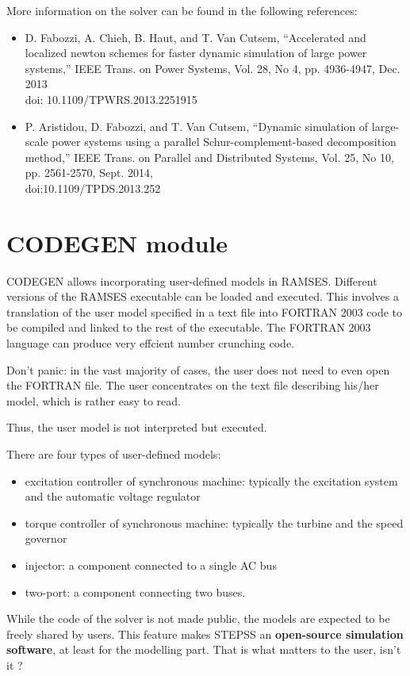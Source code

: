 More information on the solver can be found in the following references:
\begin{itemize}
\item{} D. Fabozzi, A. Chieh, B. Haut, and T. Van Cutsem, ``Accelerated and localized newton schemes for faster dynamic simulation of large power systems,'' IEEE Trans. on Power Systems, Vol. 28, No 4, pp. 4936-4947, Dec. 2013\\ doi: 10.1109/TPWRS.2013.2251915
\item{} P. Aristidou, D. Fabozzi, and T. Van Cutsem, ``Dynamic simulation of large-scale power systems using a parallel Schur-complement-based decomposition method,'' IEEE Trans. on Parallel and Distributed Systems, Vol. 25, No 10, pp. 2561-2570, Sept. 2014,\\ doi:10.1109/TPDS.2013.252
\end{itemize}

\section{CODEGEN module}

CODEGEN allows incorporating user-defined models in RAMSES. Different versions of the RAMSES executable can be loaded and executed. This involves a translation of the user model specified in a text file into FORTRAN 2003 code to be compiled and linked to the rest of the executable.  The FORTRAN 2003 language can produce very effcient number crunching code. 

Don't panic: in the vast majority of cases, the user does not need to even open the FORTRAN file. The user concentrates on the text file describing his/her model, which is rather easy to read.

Thus, the user model is not interpreted but executed.

There are four types of user-defined models:
\begin{itemize}
\item excitation controller of synchronous machine: typically the excitation system and the automatic voltage regulator
\item torque controller of synchronous machine: typically the turbine and the speed governor
\item injector: a component connected to a single AC bus
\item two-port: a component connecting two buses.
\end{itemize}

While the code of the solver is not made public, the models are expected to be freely shared by users.
This feature makes STEPSS an {\bf \large open-source simulation software}, at least for the modelling part. That is what matters to the user, isn't it ?



